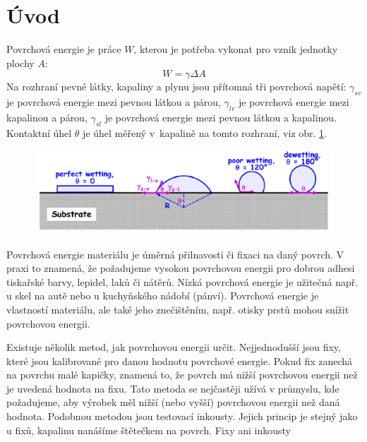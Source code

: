 \documentclass{protokol}
\begin{document}
\header
\section{Úvod}
\par Povrchová energie je práce $W$, kterou je potřeba vykonat pro vznik 
jednotky plochy $A$:
\begin{equation}
	W = \gamma\Delta A
\end{equation}
Na rozhraní pevné látky, kapaliny a plynu jsou přítomná tři povrchová napětí: 
$\gamma_{sv}$ je povrchová energie mezi pevnou látkou a párou, $\gamma_{lv}$ je 
povrchová energie mezi kapalinou a párou, $\gamma_{sl}$ je povrchová energie 
mezi pevnou látkou a kapalinou. Kontaktní úhel $\theta$ je úhel měřený 
v~kapalině na tomto rozhraní, viz obr. \ref{wetting}. 
\begin{figure}[b]
	\begin{center}
		\includegraphics[width=\textwidth]{wetting.png}
		\label{wetting}
	\end{center} 
\end{figure}
\par Povrchová energie materiálu je úměrná přilnavosti či fixaci na daný 
povrch. V praxi to znamená, že požadujeme vysokou povrchovou energii pro dobrou 
adhesi tiskařské barvy, lepidel, laků či nátěrů. Nízká povrchová energie je 
užitečná např. u skel na autě nebo u kuchyňského nádobí (pánví). Povrchová 
energie je vlastností materiálu, ale také jeho znečištěním, 
např. otisky prstů mohou snížit povrchovou energii.
\par Existuje několik metod, jak povrchovou energii určit. Nejjednodušší jsou 
fixy, které jsou kalibrované pro danou hodnotu povrchové energie. Pokud fix 
zanechá na povrchu malé kapičky, znamená to, že povrch má nižší povrchovou 
energii než je uvedená hodnota na fixu. Tato metoda se nejčastěji užívá v 
průmyslu, kde požadujeme, aby výrobek měl nižší (nebo vyšší) povrchovou energii 
než daná hodnota. Podobnou metodou jsou testovací inkousty. Jejich princip je 
stejný jako u fixů, kapalinu nanášíme štětečkem na povrch. Fixy ani inkousty 
\end{document}
